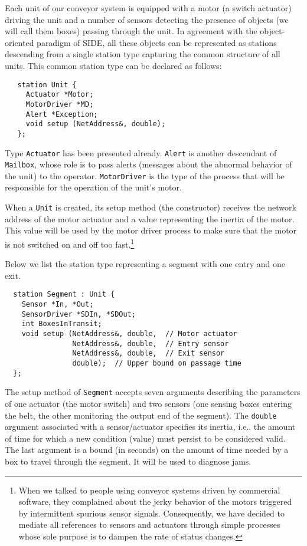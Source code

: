 Each unit of our conveyor system
is equipped with a motor (a switch actuator) driving the unit and a
number of sensors detecting the presence of objects (we will call them
boxes) passing through the unit.
In agreement with the object-oriented paradigm of SIDE, all these objects
can be represented as stations descending from a single station type
capturing the common structure of all units.
This common station type can be declared as follows:

{\small\begin{verbatim}
   station Unit {
     Actuator *Motor;
     MotorDriver *MD;
     Alert *Exception;
     void setup (NetAddress&, double);
   };
\end{verbatim}}

Type {\tt Actuator} has been presented already.
{\tt Alert} is another descendant of {\tt Mailbox}, whose role is to pass
alerts (messages about the abnormal behavior of the unit) to the operator.
{\tt MotorDriver} is the type of the process that will be responsible for
the operation of the unit's motor.

When a {\tt Unit} is created, its setup method (the constructor) receives
the network address of the motor actuator and a value representing the
inertia of the motor.
This value will be used by the motor driver process to make sure that
the motor is not switched on and off too
fast.\footnote{When we talked to people using
conveyor systems driven by commercial software, they complained about
the jerky behavior of the motors triggered by intermittent spurious sensor
signals.
Consequently, we have decided
to mediate all references to sensors and actuators
through simple processes whose sole purpose is to
dampen the rate of status changes.}

Below we list the station type representing a segment with one entry and one
exit.

{\small\begin{verbatim}
  station Segment : Unit {
    Sensor *In, *Out;
    SensorDriver *SDIn, *SDOut;
    int BoxesInTransit;
    void setup (NetAddress&, double,  // Motor actuator
                NetAddress&, double,  // Entry sensor
                NetAddress&, double,  // Exit sensor
                double);  // Upper bound on passage time
  };
\end{verbatim}}

The setup method of {\tt Segment} accepts seven
arguments describing the parameters
of one actuator (the motor switch) and two sensors (one sensing boxes
entering the belt, the other monitoring the output end of the segment).
The {\tt double} argument associated with a sensor/actuator specifies its
inertia, i.e., the amount of time for which a new condition (value) must
persist to be considered valid.
The last argument is a bound (in seconds) on the amount of time needed by
a box to travel through the segment.
It will be used to diagnose jams.


